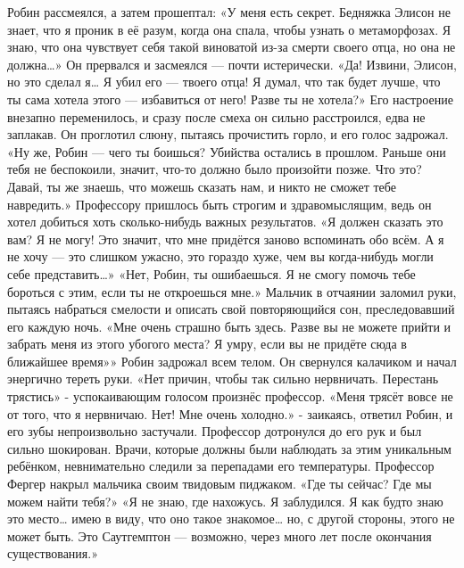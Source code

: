 \documentclass[a4paper,12pt]{book}
\begin{document}
	Робин рассмеялся, а затем прошептал:
	«У меня есть секрет. Бедняжка Элисон не знает, что я проник в её разум, когда она спала, чтобы узнать о метаморфозах. Я знаю, что она чувствует себя такой виноватой из-за смерти своего отца, но она не должна…»
	Он прервался и засмеялся — почти истерически.
	«Да! Извини, Элисон, но это сделал я… Я убил его — твоего отца! Я думал, что так будет лучше, что ты сама хотела этого — избавиться от него! Разве ты не хотела?»
	Его настроение внезапно переменилось, и сразу после смеха он сильно расстроился, едва не заплакав. Он проглотил слюну, пытаясь прочистить горло, и его голос задрожал.
	«Ну же, Робин — чего ты боишься? Убийства остались в прошлом. Раньше они тебя не беспокоили, значит, что-то должно было произойти позже. Что это? Давай, ты же знаешь, что можешь сказать нам, и никто не сможет тебе навредить.»
	Профессору пришлось быть строгим и здравомыслящим, ведь он хотел добиться хоть сколько-нибудь важных результатов.
	«Я должен сказать это вам? Я не могу! Это значит, что мне придётся заново вспоминать обо всём. А я не хочу — это слишком ужасно, это гораздо хуже, чем вы когда-нибудь могли себе представить…»
	«Нет, Робин, ты ошибаешься. Я не смогу помочь тебе бороться с этим, если ты не откроешься мне.»
	Мальчик в отчаянии заломил руки, пытаясь набраться смелости и описать свой повторяющийся сон, преследовавший его каждую ночь.
	«Мне очень страшно быть здесь. Разве вы не можете прийти и забрать меня из этого убогого места? Я умру, если вы не придёте сюда в ближайшее время»»
	Робин задрожал всем телом. Он свернулся калачиком и начал энергично тереть руки. 
	«Нет причин, чтобы так сильно нервничать. Перестань трястись» - успокаивающим голосом произнёс профессор.
	«Меня трясёт вовсе не от того, что я нервничаю. Нет! Мне очень холодно.» - заикаясь, ответил Робин, и его зубы непроизвольно застучали.
	Профессор дотронулся до его рук и был сильно шокирован. Врачи, которые должны были наблюдать за этим уникальным ребёнком, невнимательно следили за перепадами его температуры. Профессор Фергер накрыл мальчика своим твидовым пиджаком.
	«Где ты сейчас? Где мы можем найти тебя?»
	«Я не знаю, где нахожусь. Я заблудился. Я как будто знаю это место… имею в виду, что оно такое знакомое… но, с другой стороны, этого не может быть. Это Саутгемптон — возможно, через много лет после окончания существования.»
\end{document}
